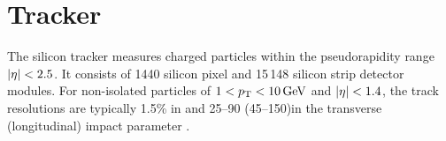 
\section{Tracker}

The silicon tracker measures charged particles within the pseudorapidity range $\lvert \eta \rvert < 2.5$. It consists of 1440 silicon pixel and 15\,148 silicon strip detector modules. For non-isolated particles of $1 < p_{\mathrm{T}} < 10\,\text{Ge\hspace{-.08em}V}$ and $\lvert \eta \rvert < 1.4$, the track resolutions are typically 1.5\% in \pt and 25--90 (45--150)\mum in the transverse (longitudinal) impact parameter \cite{TRK-11-001}.
